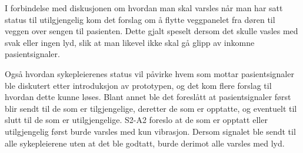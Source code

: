 \noindent
I forbindelse med diskusjonen om hvordan man skal varsles når man har satt status til utilgjengelig kom det forslag om å flytte veggpanelet fra døren til veggen over sengen til pasienten. Dette gjalt speselt dersom det skulle vasles med svak eller ingen lyd, slik at man likevel ikke skal gå glipp av inkomne pasientsignaler.

\noindent
Også hvordan sykepleierenes status vil påvirke hvem som mottar pasientsignaler ble diskutert etter introduksjon av prototypen, og det kom flere forslag til hvordan dette kunne løses. Blant annet ble det foreslått at pasientsignaler først blir sendt til de som er tilgjengelige, deretter de som er opptatte, og eventuelt til slutt til de som er utilgjengelige. S2-A2 foreslo at de som er opptatt eller utilgjengelig først burde varsles med kun vibrasjon. Dersom signalet ble sendt til alle sykepleierene uten at det ble godtatt, burde derimot alle varsles med lyd.
